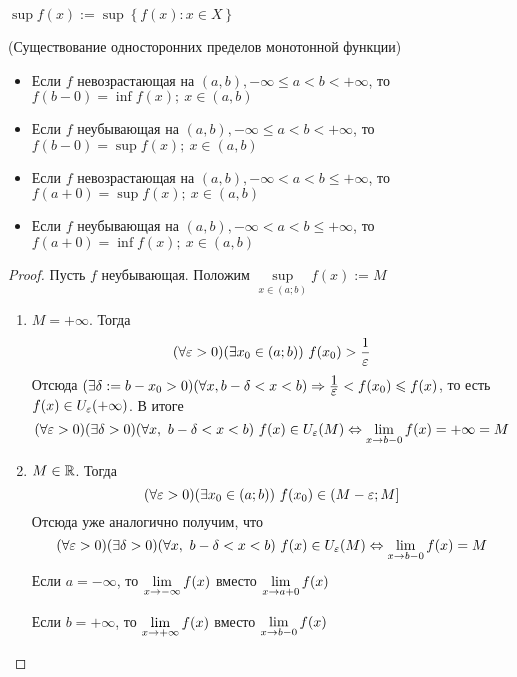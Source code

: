 \begin{definition}
	$\sup f(x) := \sup \left\{f(x) : x \in X\right\}$ 
\end{definition}

\begin{theorem} (Существование односторонних пределов монотонной функции)
	
	\begin{itemize}
		\item Если $f$ невозрастающая на $(a, b), -\infty \le a
			< b < +\infty$, то $f(b - 0) = \inf f(x); \ x \in (a, b)$
		\item Если $f$ неубывающая на $(a, b), -\infty \le a
			< b < +\infty$, то $f(b - 0) = \sup f(x); \ x \in (a, b)$
		\item Если $f$ невозрастающая на $(a, b), -\infty < a
			< b \le +\infty$, то $f(a + 0) = \sup f(x); \ x \in (a, b)$
		\item Если $f$ неубывающая на $(a, b), -\infty < a
			< b \le +\infty$, то $f(a + 0) = \inf f(x); \ x \in (a, b)$
	\end{itemize}
\end{theorem}

\begin{proof}
	Пусть $f$ неубывающая. Положим $\sup\limits_{x \in (a; b)} f(x) := M$
	\begin{enumerate}
		\item $M = +\infty$. Тогда
		\[
			(\forall \varepsilon > 0)(\exists x_0 \in (a; b))\ f(x_0)
			 > \frac{\displaystyle 1}{\displaystyle \varepsilon}
		\]
		Отсюда $(\exists \delta := b - x_0 > 0)
		(\forall x, b - \delta < x < b) \Rightarrow
		\frac{\displaystyle 1}{\displaystyle \varepsilon} < f(x_0) \leqslant f(x)$,
		то есть $f(x) \in U_{\varepsilon}(+\infty)$. В итоге
		\[
			(\forall \varepsilon > 0)(\exists \delta > 0)
			(\forall x,\ b - \delta < x < b)\ f(x)
			 \in U_{\varepsilon}(M) \Leftrightarrow \lim\limits_{x \to b-0} f(x) = +\infty = M
		\]
		
		\item $M \in \mathbb{R}$. Тогда
		\[
			(\forall \varepsilon > 0)(\exists x_0 \in (a; b))
			\ f(x_0) \in (M - \varepsilon; M]
		\]
		Отсюда уже аналогично получим, что
		\[
			(\forall \varepsilon > 0)(\exists \delta > 0)
			(\forall x,\ b - \delta < x < b)\ f(x)
			 \in U_{\varepsilon}(M) \Leftrightarrow \lim\limits_{x \to b-0} f(x) = M
		\]
		Если $a = -\infty$, то $\lim\limits_{x \to -\infty}
		f(x)$ вместо $\lim\limits_{x \to a+0} f(x)$
		
		Если $b = +\infty$, то $\lim\limits_{x \to +\infty}
		f(x)$ вместо $\lim\limits_{x \to b-0} f(x)$
		
	\end{enumerate}
\end{proof}

